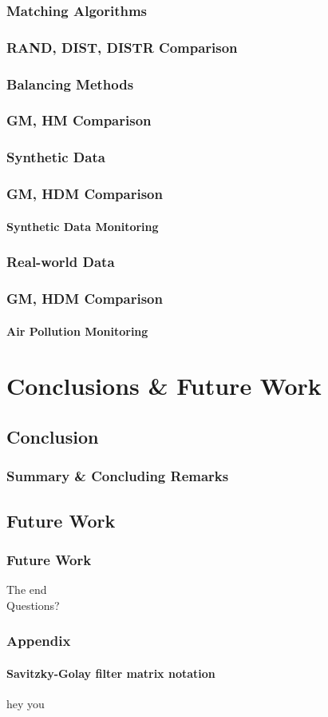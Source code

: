 \documentclass[hyperref={pdfpagelabels=false}]{beamer}
\begin{document}
\subsubsection*{ Matching Algorithms}
\begin{frame} \frametitle{RAND, DIST, DISTR Comparison}

\end{frame}
\subsubsection*{Balancing Methods}
\begin{frame} \frametitle{GM, HM Comparison}

\end{frame}
\subsubsection*{Synthetic Data}
\begin{frame} \frametitle{GM, HDM Comparison}\framesubtitle{Synthetic Data Monitoring}

\end{frame}
\subsubsection*{Real-world Data}
\begin{frame} \frametitle{GM, HDM Comparison}\framesubtitle{Air Pollution Monitoring}

\end{frame}
\section{Conclusions \& Future Work}
\subsection{Conclusion}
\begin{frame} \frametitle{Summary \& Concluding Remarks}

\end{frame}
\subsection{Future Work}
\begin{frame} \frametitle{Future Work}

\end{frame}

\begin{frame}[plain]
\centering
The end\\
Questions?
\end{frame}

\begin{frame}[plain]\frametitle{Appendix}\framesubtitle{Savitzky-Golay filter matrix notation}
hey you
\end{frame}
\end{document}
